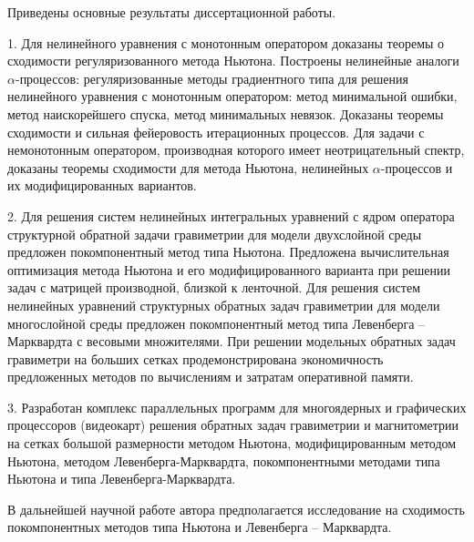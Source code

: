 \conclusion

Приведены основные результаты диссертационной работы.

1. Для нелинейного уравнения с монотонным оператором доказаны теоремы о сходимости регуляризованного метода Ньютона. 
Построены нелинейные аналоги $\alpha$-процессов:  регуляризованные методы градиентного типа для решения нелинейного уравнения с монотонным оператором: метод минимальной ошибки, метод наискорейшего спуска, метод минимальных невязок. Доказаны теоремы сходимости и сильная фейеровость итерационных процессов. Для задачи с немонотонным оператором, производная которого имеет неотрицательный спектр, доказаны теоремы сходимости для метода  Ньютона, нелинейных $\alpha$-процессов и их модифицированных вариантов.

2. Для решения систем нелинейных интегральных уравнений с 
ядром оператора структурной обратной задачи гравиметрии для 
модели двухслойной среды предложен покомпонентный метод 
типа Ньютона. Предложена вычислительная оптимизация метода 
Ньютона и его модифицированного варианта при решении задач 
с матрицей производной, близкой к ленточной. Для решения систем 
нелинейных уравнений структурных обратных задач гравиметрии 
для модели многослойной среды предложен покомпонентный
метод типа Левенберга – Марквардта с весовыми множителями.
При решении модельных обратных задач гравиметри на больших 
сетках продемонстрирована экономичность предложенных методов
по вычислениям и затратам оперативной памяти.  

3. Разработан комплекс параллельных программ для многоядерных и графических процессоров (видеокарт) решения обратных задач гравиметрии и магнитометрии на сетках большой размерности методом Ньютона, модифицированным методом Ньютона,  методом Левенберга-Марквардта, покомпонентными методами типа Ньютона и типа Левенберга-Марквардта.

В дальнейшей научной работе автора предполагается исследование на сходимость покомпонентных методов типа Ньютона и Левенберга -- Марквардта.
